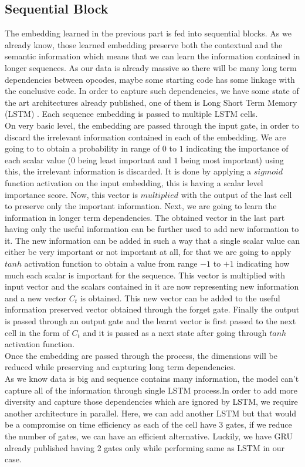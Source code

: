 \documentclass[conference]{IEEEtran}
\begin{document}
\subsection{Sequential Block}
The embedding learned in the previous part is fed into sequential blocks. As we already know, those learned embedding preserve both the contextual and the semantic information which means
that we can learn the information contained in longer sequences. As our data is already massive so there will be many long term dependencies between opcodes, maybe some starting code has some linkage with the conclusive code. In order to capture such dependencies, we have some state of the art architectures already published, one of them is Long Short Term Memory (LSTM) \cite{b1}. Each sequence embedding is passed to multiple LSTM cells.\\
On very basic level, the embedding are passed through the input gate, in order to discard the irrelevant information contained in each of the embedding. We are going to to obtain a probability in range of \(0\) to \(1\) indicating the importance of each scalar value (\(0\) being least important and \(1\) being most important) using this, the irrelevant information is discarded. It is done by applying a \(sigmoid\) function activation on the input embedding, this is having a scalar level importance score. Now, this vector is \(multiplied\) with the output of the last cell to preserve only the important information. Next, we are going to learn the information in longer term dependencies. The obtained vector in the last part having only the useful information can be further used to add new information to it. The new information can be added in  such a way that a single scalar value can either be very important or not important at all, for that we are going to apply \(tanh\) activation function to obtain
a value from range \(-1\) to \(+1\) indicating how much each scalar is important for the sequence. This vector is multiplied with input vector and the scalars contained in it are now representing new information and a new vector \(C_t\) is obtained. This new vector can be added to the useful information preserved vector obtained through the forget gate. Finally the output is passed through an output gate and the learnt vector is first passed to the next cell in the form of \(C_t\) and it is passed as a next state after going through \(tanh\) activation function.\\
Once the embedding are passed through the process, the dimensions will be reduced while preserving and capturing long term dependencies. \\
As we know data is big and sequence contains many information, the model can’t capture all of the information through single LSTM process.In order to add more diversity and capture those dependencies which are ignored by LSTM, we require another architecture in parallel. Here, we can add another LSTM but that would be a compromise on time efficiency as each of the cell have 3 gates, if we reduce the number of gates, we can have an efficient alternative. Luckily, we
have GRU \cite{b2} already published having 2 gates only while performing same as LSTM in our case.
\end{document}
